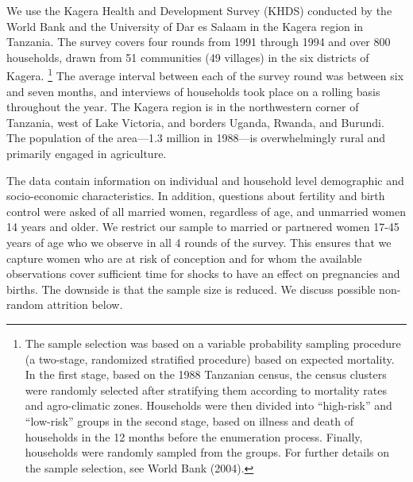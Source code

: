 \documentclass[letterpaper,12pt]{article}
\begin{document}
We use the Kagera Health and Development Survey (KHDS) conducted by the World Bank 
and the University of Dar es Salaam in the Kagera region in Tanzania. 
The survey covers four rounds from 1991 through 1994 and over 800 households, 
drawn from 51 communities (49 villages) in the six districts of Kagera.%
\footnote{
The sample selection was based on a variable probability sampling procedure 
(a two-stage, randomized stratified procedure) based on expected mortality.
In the first stage, based on the 1988 Tanzanian census, the census clusters were randomly 
selected after stratifying them according to mortality rates and agro-climatic zones. 
Households were then divided into ``high-risk'' and ``low-risk'' groups in the 
second stage, based on illness and death of households in the 12 months 
before the enumeration process.
Finally, households were randomly sampled from the groups.
For further details on the sample selection, see World Bank (2004).
}
The average interval between each of the survey round was between six and seven months, 
and interviews of households took place on a rolling basis throughout the year. 
The Kagera region is in the northwestern corner of Tanzania, west of Lake Victoria, and 
borders Uganda, Rwanda, and Burundi. 
The population of the area---1.3 million in 1988---is 
overwhelmingly rural and primarily engaged in agriculture. 




The data contain information on individual and household level demographic 
and socio-economic characteristics. 
In addition, questions about fertility and birth control were asked of all 
married women, regardless of age, and unmarried women 14 years and older. 
We restrict our sample to married or partnered women 17-45 years of age who we 
observe in all 4 rounds of the survey.
This ensures that we capture women who are at risk of conception and for whom 
the available observations cover sufficient time for shocks to have an effect
on pregnancies and births.
The downside is that the sample size is reduced.
We discuss possible non-random attrition below.


\end{document}
